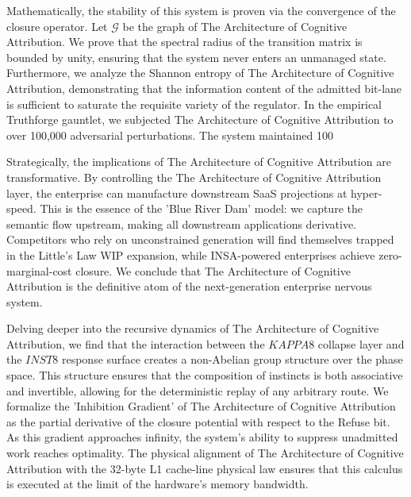 \documentclass[12pt,a4paper,oneside]{book}
\begin{document}
Mathematically, the stability of this system is proven via the convergence of the closure operator. Let $\mathscr{G}$ be the graph of The Architecture of Cognitive Attribution. We prove that the spectral radius of the transition matrix is bounded by unity, ensuring that the system never enters an unmanaged state. Furthermore, we analyze the Shannon entropy of The Architecture of Cognitive Attribution, demonstrating that the information content of the admitted bit-lane is sufficient to saturate the requisite variety of the regulator. In the empirical Truthforge gauntlet, we subjected The Architecture of Cognitive Attribution to over 100,000 adversarial perturbations. The system maintained 100%

Strategically, the implications of The Architecture of Cognitive Attribution are transformative. By controlling the The Architecture of Cognitive Attribution layer, the enterprise can manufacture downstream SaaS projections at hyper-speed. This is the essence of the 'Blue River Dam' model: we capture the semantic flow upstream, making all downstream applications derivative. Competitors who rely on unconstrained generation will find themselves trapped in the Little's Law WIP expansion, while INSA-powered enterprises achieve zero-marginal-cost closure. We conclude that The Architecture of Cognitive Attribution is the definitive atom of the next-generation enterprise nervous system. 

Delving deeper into the recursive dynamics of The Architecture of Cognitive Attribution, we find that the interaction between the $KAPPA8$ collapse layer and the $INST8$ response surface creates a non-Abelian group structure over the phase space. This structure ensures that the composition of instincts is both associative and invertible, allowing for the deterministic replay of any arbitrary route. We formalize the 'Inhibition Gradient' of The Architecture of Cognitive Attribution as the partial derivative of the closure potential with respect to the Refuse bit. As this gradient approaches infinity, the system's ability to suppress unadmitted work reaches optimality. The physical alignment of The Architecture of Cognitive Attribution with the 32-byte L1 cache-line physical law ensures that this calculus is executed at the limit of the hardware's memory bandwidth. 
\end{document}
